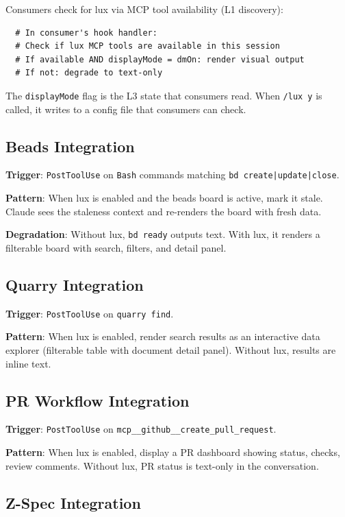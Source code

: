 \documentclass[a4paper,10pt,fleqn]{article}
\begin{document}
Consumers check for lux via MCP tool availability (L1 discovery):

\begin{verbatim}
  # In consumer's hook handler:
  # Check if lux MCP tools are available in this session
  # If available AND displayMode = dmOn: render visual output
  # If not: degrade to text-only
\end{verbatim}

The \texttt{displayMode} flag is the L3 state that consumers read.
When \texttt{/lux y} is called, it writes to a config file that
consumers can check.

\subsection{Beads Integration}

\textbf{Trigger}: \texttt{PostToolUse} on \texttt{Bash} commands
matching \texttt{bd create|update|close}.

\textbf{Pattern}: When lux is enabled and the beads board is active,
mark it stale. Claude sees the staleness context and re-renders the
board with fresh data.

\textbf{Degradation}: Without lux, \texttt{bd ready} outputs text.
With lux, it renders a filterable board with search, filters, and
detail panel.

\subsection{Quarry Integration}

\textbf{Trigger}: \texttt{PostToolUse} on \texttt{quarry find}.

\textbf{Pattern}: When lux is enabled, render search results as an
interactive data explorer (filterable table with document detail panel).
Without lux, results are inline text.

\subsection{PR Workflow Integration}

\textbf{Trigger}: \texttt{PostToolUse} on
\texttt{mcp\_\_github\_\_create\_pull\_request}.

\textbf{Pattern}: When lux is enabled, display a PR dashboard
showing status, checks, review comments. Without lux, PR status is
text-only in the conversation.

\subsection{Z-Spec Integration}
\end{document}
